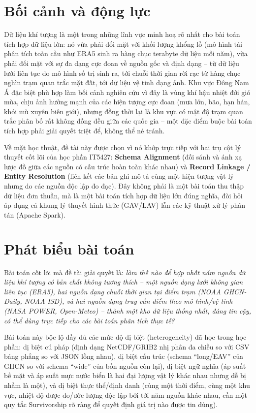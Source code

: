 \documentclass[12pt,a4paper]{report}
\begin{document}
\section{Bối cảnh và động lực}

Dữ liệu khí tượng là một trong những lĩnh vực minh hoạ rõ nhất cho bài toán tích hợp dữ liệu lớn: nó vừa phải đối mặt với khối lượng khổng lồ (mô hình tái phân tích toàn cầu như ERA5 sinh ra hàng chục terabyte dữ liệu mỗi năm), vừa phải đối mặt với sự đa dạng cực đoan về nguồn gốc và định dạng -- từ dữ liệu lưới liên tục do mô hình số trị sinh ra, tới chuỗi thời gian rời rạc từ hàng chục nghìn trạm quan trắc mặt đất, tới dữ liệu vệ tinh dạng ảnh. Khu vực Đông Nam Á đặc biệt phù hợp làm bối cảnh nghiên cứu vì đây là vùng khí hậu nhiệt đới gió mùa, chịu ảnh hưởng mạnh của các hiện tượng cực đoan (mưa lớn, bão, hạn hán, khói mù xuyên biên giới), nhưng đồng thời lại là khu vực có mật độ trạm quan trắc phân bố rất không đồng đều giữa các quốc gia -- một đặc điểm buộc bài toán tích hợp phải giải quyết triệt để, không thể né tránh.

Về mặt học thuật, đề tài này được chọn vì nó khớp trực tiếp với hai trụ cột lý thuyết cốt lõi của học phần IT5427: \textbf{Schema Alignment} (đối sánh và ánh xạ lược đồ giữa các nguồn có cấu trúc hoàn toàn khác nhau) và \textbf{Record Linkage / Entity Resolution} (liên kết các bản ghi mô tả cùng một hiện tượng vật lý nhưng do các nguồn độc lập đo đạc). Đây không phải là một bài toán thu thập dữ liệu đơn thuần, mà là một bài toán tích hợp dữ liệu lớn đúng nghĩa, đòi hỏi áp dụng cả khung lý thuyết hình thức (GAV/LAV) lẫn các kỹ thuật xử lý phân tán (Apache Spark).

\section{Phát biểu bài toán}

Bài toán cốt lõi mà đề tài giải quyết là: \emph{làm thế nào để hợp nhất năm nguồn dữ liệu khí tượng có bản chất không tương thích -- một nguồn dạng lưới không gian liên tục (ERA5), hai nguồn dạng chuỗi thời gian tại điểm trạm (NOAA GHCN-Daily, NOAA ISD), và hai nguồn dạng truy vấn điểm theo mô hình/vệ tinh (NASA POWER, Open-Meteo) -- thành một kho dữ liệu thống nhất, đáng tin cậy, có thể dùng trực tiếp cho các bài toán phân tích thực tế?}

Bài toán này bộc lộ đầy đủ các mức độ dị biệt (heterogeneity) đã học trong học phần: dị biệt cú pháp (định dạng NetCDF/GRIB2 nhị phân đa chiều so với CSV bảng phẳng so với JSON lồng nhau), dị biệt cấu trúc (schema ``long/EAV'' của GHCN so với schema ``wide'' của bốn nguồn còn lại), dị biệt ngữ nghĩa (áp suất bề mặt và áp suất mực nước biển là hai đại lượng vật lý khác nhau nhưng dễ bị nhầm là một), và dị biệt thực thể/định danh (cùng một thời điểm, cùng một khu vực, nhiệt độ được đo/ước lượng độc lập bởi tới năm nguồn khác nhau, cần một quy tắc Survivorship rõ ràng để quyết định giá trị nào được tin dùng).
\end{document}

